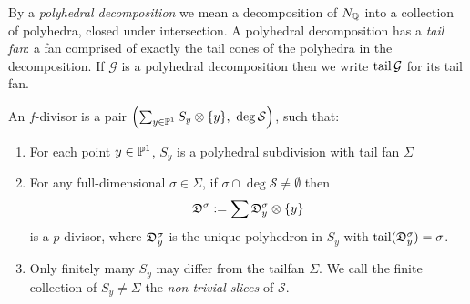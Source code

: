 By a \textit{polyhedral decomposition} we mean a decomposition of \(N_{\mathbb{Q}}\) into a collection of polyhedra, closed under intersection. A polyhedral decomposition has a \textit{tail fan}: a fan comprised of exactly the tail cones of the polyhedra in the decomposition. If \(\mathcal{G}\) is a polyhedral decomposition then we write \(\operatorname{tail} \mathcal{G}\) for its tail fan.
\begin{definition}
An \(f\)-divisor is a pair \( \left( \sum_{y \in \mathbb{P}^1} S_y \otimes \{y\}, \ \deg \mathcal{S} \right)\), such that:
\begin{enumerate}
\item For each point \(y \in \mathbb{P}^1\),  \(S_y\) is a polyhedral subdivision with tail fan \(\Sigma\)
\item For any full-dimensional \(\sigma \in \Sigma\), if \(\sigma \cap \deg \mathcal{S} \neq \emptyset \) then
\[
{\mathfrak{D}}^\sigma := \sum {\mathfrak{D}}_y^\sigma \otimes \{y\}
\]
is a \(p\)-divisor, where \({\mathfrak{D}}_y^\sigma\) is the unique polyhedron in \(S_y\) with \(\operatorname{tail}({\mathfrak{D}}_y^\sigma) = \sigma\).
\item Only finitely many \(S_y\) may differ from the tailfan \(\Sigma\). We call the finite collection of \(S_y \neq \Sigma\) the \textit{non-trivial slices} of \(\mathcal{S}\).
\end{enumerate}
\end{definition}
